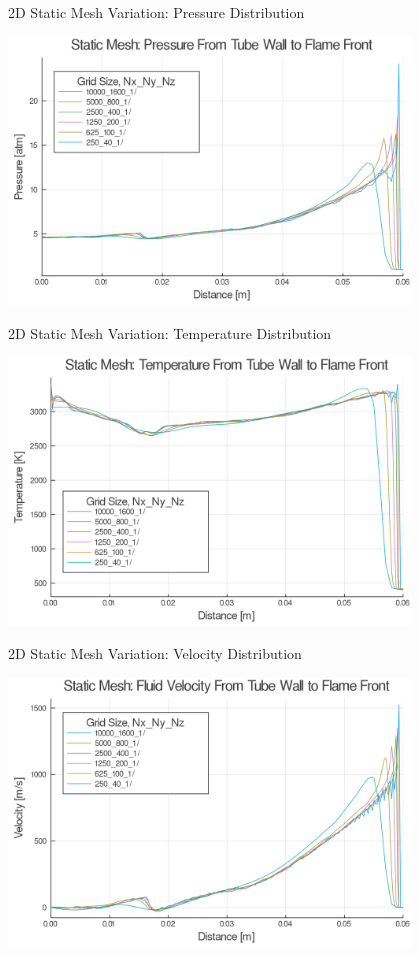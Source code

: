 \begin{frame}{2D Static Mesh Variation: Pressure Distribution}
\begin{center}
\includegraphics[width=0.8\textwidth]{../figs/staticfigs/p.png}
\end{center}
\end{frame}

\begin{frame}{2D Static Mesh Variation: Temperature Distribution}
\begin{center}
\includegraphics[width=0.8\textwidth]{../figs/staticfigs/t.png}
\end{center}
\end{frame}

\begin{frame}{2D Static Mesh Variation: Velocity Distribution}
\begin{center}
\includegraphics[width=0.8\textwidth]{../figs/staticfigs/u.png}
\end{center}
\end{frame}

